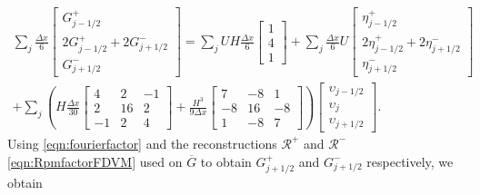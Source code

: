 \begin{multline*}
\sum_j \frac{\Delta x}{6}\begin{bmatrix} G^+_{j -1/2} \\2 G^+_{j -1/2}+2 G^-_{j +1/2} \\ G^-_{j +1/2} \end{bmatrix} = \sum_jUH \frac{\Delta x}{6}\begin{bmatrix} 1 \\4 \\ 1 \end{bmatrix} +  \sum_j \frac{\Delta x}{6}U\begin{bmatrix} \eta^+_{j -1/2} \\2 \eta^+_{j -1/2}+2 \eta^-_{j +1/2} \\ \eta^-_{j +1/2} \end{bmatrix}\\ + \sum_j \left(H\frac{\Delta x}{30}\begin{bmatrix} 4 &2 &-1 \\2 &16 &2  \\-1 &2 &4 \end{bmatrix} + \frac{H^3 }{9\Delta x}\begin{bmatrix} 7 &-8 &1  \\-8 &16 &-8  \\1 &-8 &7  \end{bmatrix} \right) \begin{bmatrix} \upsilon_{j -1/2} \\\upsilon_{j} \\ \upsilon_{j +1/2} \end{bmatrix}.
\end{multline*} 
Using \eqref{eqn:fourierfactor} and the reconstructions $\mathcal{R}^+$ and $\mathcal{R}^-$ \eqref{eqn:RpmfactorFDVM} used on $\overline{G}$ to obtain $G^+_{j +1/2}$ and $G^-_{j +1/2}$ respectively, we obtain

